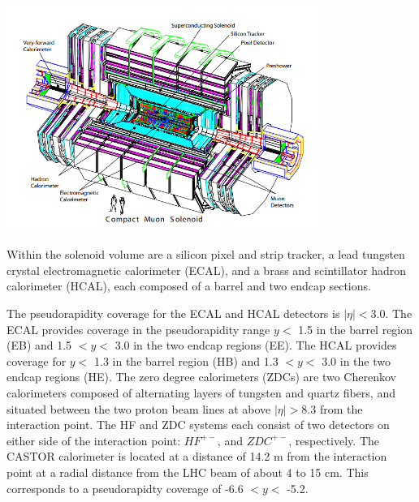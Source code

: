 \centerline{
\includegraphics[width=4in]{Chapter3/importfigs/fromCMS_DesignPaper_perspective.png}
}

	Within the solenoid volume are a silicon pixel and strip tracker, a lead tungsten crystal electromagnetic calorimeter (ECAL), and a brass and scintillator hadron calorimeter (HCAL), each composed of a barrel and two endcap sections. 

The pseudorapidity coverage for the ECAL and HCAL detectors is $|\eta|< 3.0$. The ECAL provides coverage in the pseudorapidity range $y < $ 1.5 in the barrel region (EB) and 1.5 $< y <$ 3.0 in the two endcap regions (EE). The HCAL provides coverage for $y <$ 1.3 in the barrel region (HB) and 1.3 $< y< $ 3.0 in the two endcap regions (HE). The zero degree calorimeters (ZDCs) are two Cherenkov calorimeters composed of alternating layers of tungsten and quartz fibers, and situated between the two proton beam lines at above $|\eta|>8.3$ from the interaction point. The HF and ZDC systems each consist of two detectors on either side of the interaction point: $HF^{+-}$, and $ZDC^{+-}$, respectively. The CASTOR calorimeter is located at a distance of 14.2 m from the interaction point at a radial distance from the LHC beam of about 4 to 15 cm. This corresponds to a pseudorapidty coverage of -6.6 $< y <$ -5.2.

